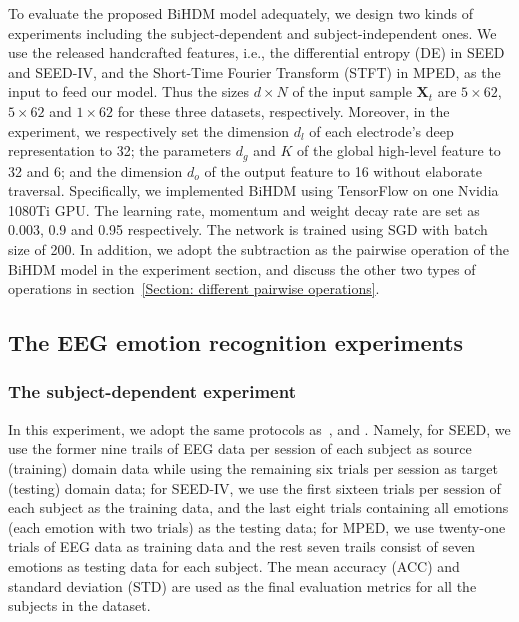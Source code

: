 \documentclass[journal]{IEEEtran}
\begin{document}
To evaluate the proposed BiHDM model adequately, we design two kinds of experiments including the subject-dependent and subject-independent ones. We use the released handcrafted features, i.e., the differential entropy (DE) in SEED and SEED-IV, and the Short-Time Fourier Transform (STFT) in MPED, as the input to feed our model. Thus the sizes $d\!\times\! N$ of the input sample $\mathbf{X}_t$ are $5\!\times\!62$, $5\!\times\!62$ and $1\!\times\!62$ for these three datasets, respectively. Moreover, in the experiment, we respectively set the dimension $d_l$ of each electrode's deep representation to 32; the parameters $d_g$ and $K$ of the global high-level feature to 32 and 6; and the dimension $d_o$ of the output feature to 16 without elaborate traversal. Specifically, we implemented BiHDM using TensorFlow on one Nvidia 1080Ti GPU. The learning rate, momentum and weight decay rate are set as 0.003, 0.9 and 0.95 respectively. The network is trained using SGD with batch size of 200. In addition, we adopt the subtraction as the pairwise operation of the BiHDM model in the experiment section, and discuss the other two types of operations in section~\ref{Section: different pairwise operations}.


\subsection{The EEG emotion recognition experiments}
\subsubsection{The subject-dependent experiment}
In this experiment, we adopt the same protocols as~\cite{zheng2015investigating}, \cite{zheng2018emotionmeter} and \cite{8606087}. Namely, for SEED, we use the former nine trails of EEG data per session of each subject as source (training) domain data while using the remaining six trials per session as target (testing) domain data; for SEED-IV, we use the first sixteen trials per session of each subject as the training data, and the last eight trials containing all emotions (each emotion with two trials) as the testing data; for MPED, we use twenty-one trials of EEG data as training data and the rest seven trails consist of seven emotions as testing data for each subject. The mean accuracy (ACC) and standard deviation (STD) are used as the final evaluation metrics for all the subjects in the dataset. 
\end{document}
